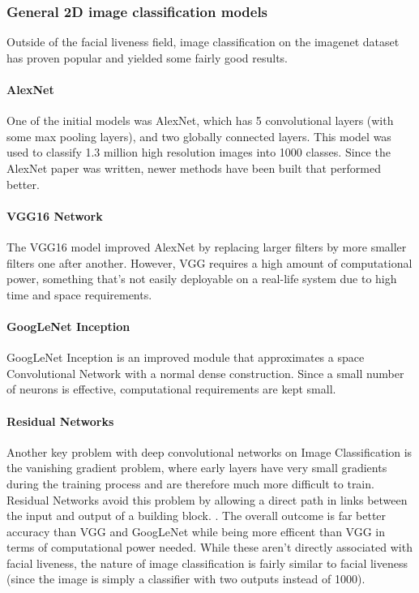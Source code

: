 \documentclass[10pt,a4paper]{article}
\begin{document}
        \subsubsection{General 2D image classification models}
        Outside of the facial liveness field, image classification on the imagenet dataset has proven popular and yielded some fairly good
        results. 
        
        \paragraph{AlexNet} 
        One of the initial models was AlexNet, which has 5 convolutional layers (with some max pooling layers), and two globally connected layers.
        This model was used to classify 1.3 million high resolution images into 1000 classes. \cite{AlexNet} Since the AlexNet paper was written,
        newer methods have been built that performed better. 
        
        \paragraph{VGG16 Network}
        The VGG16 model improved AlexNet by replacing larger filters by more smaller filters one after another.
        However, VGG requires a high amount of computational power, something that's not easily deployable  on a real-life system
        due to high time and space requirements. 
        

        \paragraph{GoogLeNet Inception}
        GoogLeNet Inception is an improved module that approximates a space Convolutional Network with a normal
        dense construction. Since a small number of neurons is effective, computational requirements are kept small. 
        
        \paragraph{Residual Networks}
        Another key problem with deep convolutional networks on Image Classification is the vanishing gradient problem, where early layers have very small gradients during the training process and
        are therefore much more difficult to train. Residual Networks avoid this problem by allowing a direct path in links between the input and output of a building block. .
        The overall outcome is far better accuracy than VGG and GoogLeNet while being more efficent than VGG in terms of computational power needed. 
        While these aren't directly associated with facial liveness, the nature of image classification is fairly similar to facial liveness (since the image is simply a classifier with two outputs instead of 1000).
\end{document}
